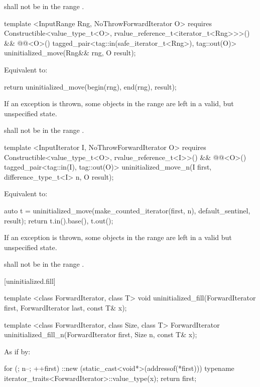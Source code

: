 {\color{addclr}
\pnum
\requires {} shall not be in the range .

\begin{codeblock}
template <InputRange Rng, NoThrowForwardIterator O>
  requires Constructible<value_type_t<O>, rvalue_reference_t<iterator_t<Rng>>>() &&
           @@<O>()
    tagged_pair<tag::in(safe_iterator_t<Rng>), tag::out(O)>
    uninitialized_move(Rng&& rng, O result);
\end{codeblock}

\pnum
\effects Equivalent to:
\begin{codeblock}
        return uninitialized_move(begin(rng), end(rng), result);
\end{codeblock}

\pnum
\remarks If an exception is thrown, some objects in the range  are left in a valid, but
unspecified state.

\pnum
\requires {} shall not be in the range .

\begin{codeblock}
template <InputIterator I, NoThrowForwardIterator O>
  requires Constructible<value_type_t<O>, rvalue_reference_t<I>>() &&
           @@<O>()
    tagged_pair<tag::in(I), tag::out(O)>
    uninitialized_move_n(I first, difference_type_t<I> n, O result);
\end{codeblock}

\pnum
\effects Equivalent to:
\begin{codeblock}
        auto t = uninitialized_move(make_counted_iterator(first, n),
                                    default_sentinel{}, result);
        return {t.in().base(), t.out()};
\end{codeblock}

\pnum
} %
\remarks If an exception is thrown, some objects in the range 
are left in a valid\added{,} but unspecified state.

\pnum
\requires {} shall not be in the range .

[uninitialized.fill]{}
{\color{remclr}
\begin{codeblock}
template <class ForwardIterator, class T>
  void uninitialized_fill(ForwardIterator first, ForwardIterator last,
                          const T& x);
\end{codeblock}

\begin{codeblock}
template <class ForwardIterator, class Size, class T>
  ForwardIterator uninitialized_fill_n(ForwardIterator first, Size n, const T& x);
\end{codeblock}

\setcounter{Paras}{1}
\pnum
\effects As if by:
\begin{codeblock}
        for (; n--; ++first)
          ::new (static_cast<void*>(addressof(*first)))
            typename iterator_traits<ForwardIterator>::value_type(x);
        return first;
\end{codeblock}
} %

